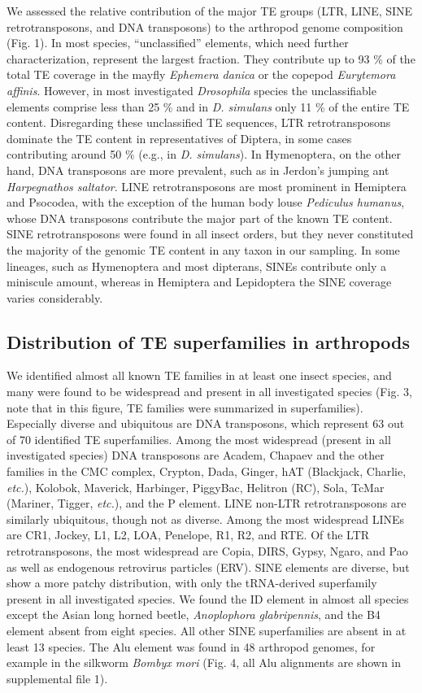 We assessed the relative contribution of the major TE groups (LTR, LINE,
SINE retrotransposons, and DNA transposons) to the arthropod genome
composition (Fig. 1). In most species, ``unclassified'' elements, which
need further characterization, represent the largest fraction. They
contribute up to 93 \% of the total TE coverage in the mayfly
\emph{Ephemera danica} or the copepod \emph{Eurytemora affinis}.
However, in most investigated \emph{Drosophila} species the
unclassifiable elements comprise less than 25 \% and in \emph{D.
simulans} only 11 \% of the entire TE content. Disregarding these
unclassified TE sequences, LTR retrotransposons dominate the TE content
in representatives of Diptera, in some cases contributing around 50 \%
(e.g., in \emph{D. simulans}). In Hymenoptera, on the other hand, DNA
transposons are more prevalent, such as in Jerdon's jumping ant
\emph{Harpegnathos saltator}. LINE retrotransposons are most prominent
in Hemiptera and Psocodea, with the exception of the human body louse
\emph{Pediculus humanus}, whose DNA transposons contribute the major
part of the known TE content. SINE retrotransposons were found in all
insect orders, but they never constituted the majority of the genomic TE
content in any taxon in our sampling. In some lineages, such as
Hymenoptera and most dipterans, SINEs contribute only a miniscule
amount, whereas in Hemiptera and Lepidoptera the SINE coverage varies
considerably.



\subsection{Distribution of TE superfamilies in
arthropods}\label{distribution-of-te-superfamilies-in-arthropods}

We identified almost all known TE families in at least one insect
species, and many were found to be widespread and present in all
investigated species (Fig. 3, note that in this figure, TE families were
summarized in superfamilies). Especially diverse and ubiquitous are DNA
transposons, which represent 63 out of 70 identified TE superfamilies.
Among the most widespread (present in all investigated species) DNA
transposons are Academ, Chapaev and the other families in the CMC
complex, Crypton, Dada, Ginger, hAT (Blackjack, Charlie, \emph{etc.}),
Kolobok, Maverick, Harbinger, PiggyBac, Helitron (RC), Sola, TcMar
(Mariner, Tigger, \emph{etc.}), and the P element. LINE non-LTR
retrotransposons are similarly ubiquitous, though not as diverse. Among
the most widespread LINEs are CR1, Jockey, L1, L2, LOA, Penelope, R1,
R2, and RTE. Of the LTR retrotransposons, the most widespread are Copia,
DIRS, Gypsy, Ngaro, and Pao as well as endogenous retrovirus particles
(ERV). SINE elements are diverse, but show a more patchy distribution,
with only the tRNA-derived superfamily present in all investigated
species. We found the ID element in almost all species except the Asian
long horned beetle, \emph{Anoplophora glabripennis}, and the B4 element
absent from eight species. All other SINE superfamilies are absent in at
least 13 species. The Alu element was found in 48 arthropod genomes, for
example in the silkworm \emph{Bombyx mori} (Fig. 4, all Alu alignments
are shown in supplemental file 1).

